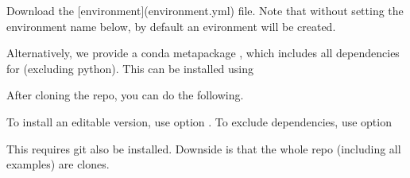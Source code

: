 \documentclass[letterpaper,10pt,english]{sphinxmanual}
\begin{document}
\sphinxAtStartPar
Download the {[}environment{]}(environment.yml) file.  Note that without setting the environment name below,
by default an evironment  will be created.

\begin{sphinxVerbatim}[commandchars=\\\{\}]
      
\end{sphinxVerbatim}

\sphinxAtStartPar
Alternatively, we provide a conda metapackage , which includes all dependencies for  (excluding python).
This can be installed using

\begin{sphinxVerbatim}[commandchars=\\\{\}]
      
\end{sphinxVerbatim}

\sphinxAtStartPar
{}

\sphinxAtStartPar
After cloning the repo, you can do the following.

\begin{sphinxVerbatim}[commandchars=\\\{\}]
  
\end{sphinxVerbatim}

\sphinxAtStartPar
To install an editable version, use option .  To exclude dependencies, use option 

\sphinxAtStartPar
{}

\sphinxAtStartPar
This requires git also be installed.  Downside is that the whole repo (including all examples) are clones.

\begin{sphinxVerbatim}[commandchars=\\\{\}]
  
\end{sphinxVerbatim}
\end{document}
